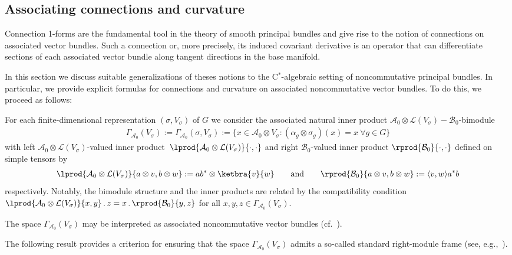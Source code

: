 \documentclass[pdftex]{sigma}
\numberwithin{equation}{section}
\newcommand*{\tensor}{\otimes}		%
\newcommand*{\Star}{$^*$\nobreakdash}
\newcommand*{\acts}{\,.\,}
\newcommand*{\alg}{\mathcal}		%
\newcommand*{\aA}{\alg{A}}			%
\newcommand*{\aB}{\alg{B}} 			%
\newcommand*{\End}{\mathcal{L}} %
\begin{document}
\subsection{Associating connections and curvature}\label{sec:infobj}

Connection 1-forms are the fundamental tool in the theory of smooth principal bundles and give rise to the notion of connections on associated vector bundles.
Such a connection or, more precisely, its induced covariant derivative is an operator that can differentiate sections of each associated vector bundle along tangent directions in the base manifold.
	
In this section we discuss suitable generalizations of theses notions to the C\Star-algebraic setting of noncommutative principal bundles.
In particular, we provide explicit formulas for connections and curvature on associated noncommutative vector bundles.
To do this, we proceed as follows:

For each finite-dimensional representation $(\sigma,V_\sigma)$ of $G$ we consider the associated natural inner product $\aA_0 \tensor \End(V_\sigma)-\aB_0$-bimodule
\begin{gather*}
\Gamma_{\aA_0}(V_\sigma) := \Gamma_{\aA_0}(\sigma,V_\sigma) := \{ x \in \aA_0 \tensor V_\sigma\colon (\alpha_g \tensor \sigma_g)(x) = x \ \forall g\in G\}%
	\end{gather*}
	with left $\aA_0 \tensor \End(V_\sigma)$-valued inner product~$\lprod{\aA_0 \tensor \End(V_\sigma)}{\cdot,\cdot}$ and right $\aB_0$-valued inner product $\rprod{\aB_0}{\cdot,\cdot}$
	defined on simple tensors by
	\begin{gather*}
		\lprod{\aA_0 \tensor \End(V_\sigma)}{a \tensor v, b \tensor w} := ab^* \tensor \ketbra{v}{w} \qquad \text{and} \qquad \rprod{\aB_0}{a \tensor v, b \tensor w} := \langle v,w \rangle a^*b %
	\end{gather*}
	respectively. Notably, the bimodule structure and the inner products are related by the compatibility condition $\lprod{\aA_0 \tensor \End(V_\sigma)}{x,y} \acts z = x \acts \rprod{\aB_0}{y,z}$ for all $x,y,z \in \Gamma_{\aA_0}(V_\sigma)$.
	
\begin{Remark}The space $\Gamma_{\aA_0}(V_\sigma)$ may be interpreted as associated noncommutative vector bundles (cf.~\cite{Wa12M}).
\end{Remark}

The following result provides a criterion for ensuring that the space $\Gamma_{\aA_0}(V_\sigma)$ admits a so-called standard right-module frame (see, e.g.,~\cite[Section~2]{Rieffel08}).
\end{document}
